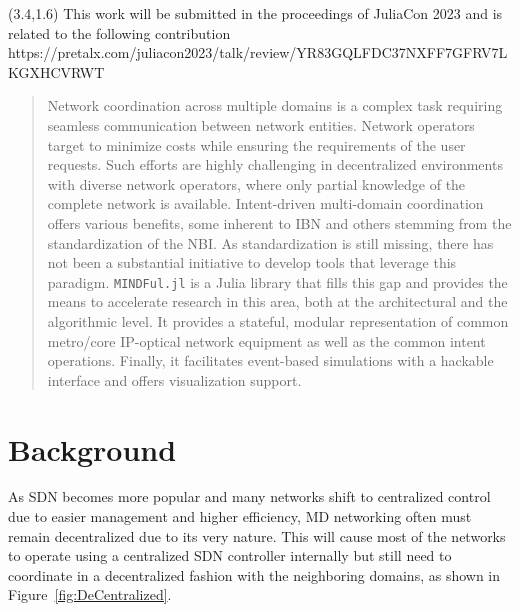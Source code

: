 \documentclass{juliacon}
\begin{document}


\maketitle

\begin{textblock}{13.5}(3.4,1.6)
    {\color{blue}
    This work will be submitted in the proceedings of JuliaCon 2023 and is related to the following contribution https://pretalx.com/juliacon2023/talk/review/YR83GQLFDC37NXFF7GFRV7LKGXHCVRWT 
    }
\end{textblock}

\begin{abstract}
    Network coordination across multiple domains is a complex task requiring seamless communication between network entities.
    Network operators target to minimize costs while ensuring the requirements of the user requests.
    Such efforts are highly challenging in decentralized environments with diverse network operators, where only partial knowledge of the complete network is available.
    Intent-driven multi-domain coordination offers various benefits, some inherent to \ac{IBN} and others stemming from the standardization of the \ac{NBI}.
    As standardization is still missing, there has not been a substantial initiative to develop tools that leverage this paradigm.
    \verb|MINDFul.jl| is a Julia library that fills this gap and provides the means to accelerate research in this area, both at the architectural and the algorithmic level.
    It provides a stateful, modular representation of common metro/core IP-optical network equipment as well as the common intent operations.
    Finally, it facilitates event-based simulations with a hackable interface and offers visualization support.
\end{abstract}

\acresetall


\section{Background}
    As \ac{SDN} \cite{2015SDN} becomes more popular and many networks shift to centralized control due to easier management and higher efficiency, \ac{MD} networking often must remain decentralized due to its very nature.
    This will cause most of the networks to operate using a centralized \ac{SDN} controller internally but still need to coordinate in a decentralized fashion with the neighboring domains, as shown in Figure~\ref{fig:DeCentralized}.
\end{document}
